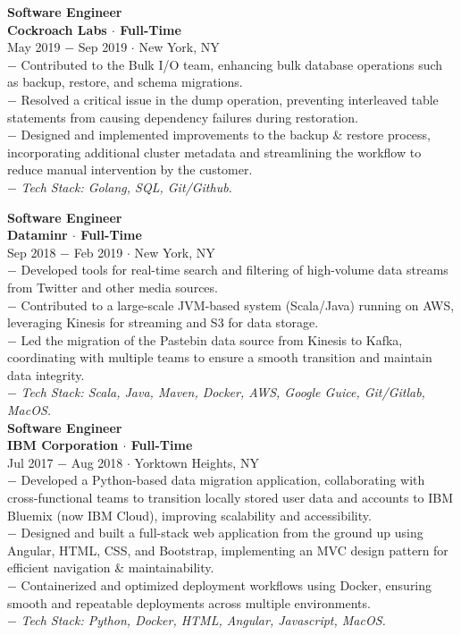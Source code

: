 \documentclass{resume}
\begin{document}
\begin{flushleft}
\newpage
\footnotesize{\bf Software Engineer}\\
\footnotesize{\bf Cockroach Labs $\cdot$ Full-Time}\\
\footnotesize{May 2019  $-$ Sep 2019 $\cdot$ New York, NY}\\[1mm]
{\scriptsize
	$-$ Contributed to the Bulk I/O team, enhancing bulk database operations such as backup, restore, and schema migrations. \\
	$-$ Resolved a critical issue in the dump operation, preventing interleaved table statements from causing dependency failures during restoration. \\
	$-$ Designed and implemented improvements to the backup \& restore process, incorporating additional cluster metadata and streamlining the workflow to reduce manual intervention by the customer.\\
	$-$ \textit{Tech Stack: Golang, SQL, Git/Github.}\\[3mm]
}

\footnotesize{\bf Software Engineer}\\
\footnotesize{\bf Dataminr $\cdot$ Full-Time}\\
\footnotesize{Sep 2018  $-$ Feb 2019 $\cdot$ New York, NY}\\[1mm]
{\scriptsize
$-$ Developed tools for real-time search and filtering of high-volume data streams from Twitter and other media sources. \\
$-$ Contributed to a large-scale JVM-based system (Scala/Java) running on AWS, leveraging Kinesis for streaming and S3 for data storage.\\
$-$ Led the migration of the Pastebin data source from Kinesis to Kafka, coordinating with multiple teams to ensure a smooth transition and maintain data integrity.\\
$-$ \textit{Tech Stack: Scala, Java, Maven, Docker, AWS, Google Guice, Git/Gitlab, MacOS.}\\[3mm]
}
\footnotesize{\bf Software Engineer}\\
\footnotesize{\bf IBM Corporation $\cdot$ Full-Time}\\
\footnotesize{Jul 2017  $-$ Aug 2018 $\cdot$ Yorktown Heights, NY}\\[1mm]
{\scriptsize
	$-$ Developed a Python-based data migration application, collaborating with cross-functional teams to transition locally stored user data and accounts to IBM Bluemix (now IBM Cloud), improving scalability and accessibility. \\
	$-$ Designed and built a full-stack web application from the ground up using Angular, HTML, CSS, and Bootstrap, implementing an MVC design pattern for efficient navigation \& maintainability. \\
	$-$ Containerized and optimized deployment workflows using Docker, ensuring smooth and repeatable deployments across multiple environments.\\
	$-$ \textit{Tech Stack: Python, Docker, HTML, Angular, Javascript, MacOS.}\\[4mm]
}


\end{flushleft}
\end{document}
